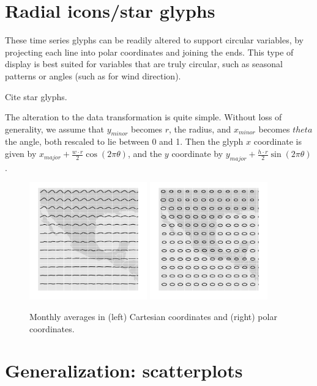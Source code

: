 \documentclass[oneside]{article}
\begin{document}
\section{Radial icons/star glyphs}

These time series glyphs can be readily altered to support circular variables, by projecting each line into polar coordinates and joining the ends. This type of display is best suited for variables that are truly circular, such as seasonal patterns or angles (such as for wind direction).

Cite star glyphs.

The alteration to the data transformation is quite simple. Without loss of generality, we assume that $y_{minor}$ becomes $r$, the radius, and $x_{minor}$ becomes $theta$ the angle, both rescaled to lie between 0 and 1. Then the glyph $x$ coordinate is given by $x_{major} + \frac{w \cdot r}{2} \cos(2 \pi \theta)$, and the $y$ coordinate by $y_{major} + \frac{h \cdot r}{2} \sin(2 \pi \theta)$.

\begin{figure}[htbp]
  \centering
  \includegraphics[width=2in]{month-cartesian}
  \includegraphics[width=2in]{month-polar}
    
  \caption{Monthly averages in (left) Cartesian coordinates and (right) polar coordinates.}
  
  \label{fig:cycle}
\end{figure}

\section{Generalization: scatterplots}
\end{document}
